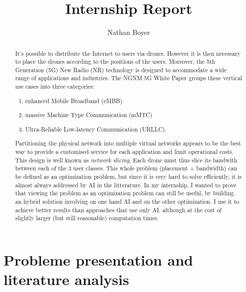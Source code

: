 \documentclass[letterpaper]{article}
\title{Internship Report}
\author{Nathan Boyer}
\begin{document}
\maketitle

\begin{abstract}

    It's possible to distribute the Internet to users via drones.
    However it is then necessary to place the drones according to the positions of the users.
    Moreover, the 5th Generation (5G) New Radio (NR) technology is designed to accommodate a wide range of applications and industries. The NGNM 5G White Paper \cite{5gwhitepaper} groups these vertical use cases into three categories:
    \begin{enumerate}
        \item enhanced Mobile Broadband (eMBB)
        \item massive Machine Type Communication (mMTC)
        \item Ultra-Reliable Low-latency Communication (URLLC).
    \end{enumerate}

    Partitioning the physical network into multiple virtual networks appears to be the best way to provide a customised service for each application and limit operational costs. This design is well known as \textit{network slicing}.
    Each drone must thus slice its bandwith between each of the 3 user classes.
    This whole problem (placement + bandwidth) can be defined as an optimization problem, but since it is very hard to solve efficiently, it is almost always addressed by AI in the litterature.
    In my internship, I wanted to prove that viewing the problem as an optimization problem can still be useful, by building an hybrid solution involving on one hand AI and on the other optimization.
    I use it to achieve better results than approaches that use only AI, although at the cost of slightly larger (but still reasonable) computation times.
\end{abstract}


\tableofcontents


\section{Probleme presentation and literature analysis}
\end{document}
